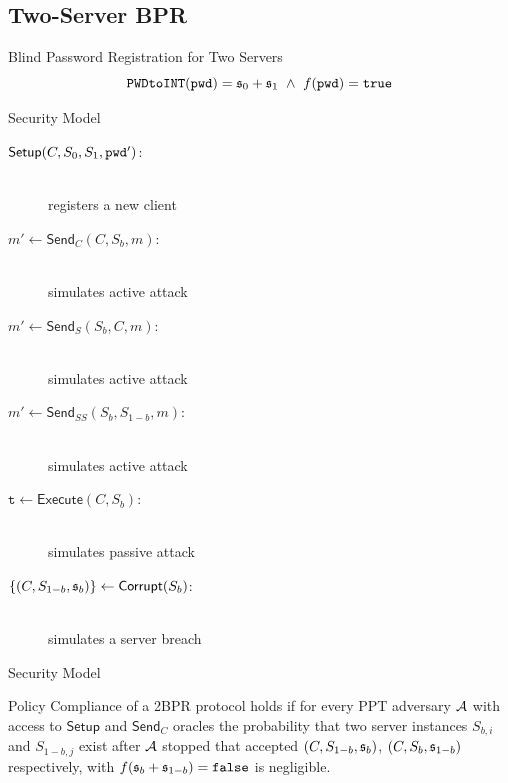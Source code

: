 \documentclass[notes,xcolor=dvipsnames]{beamer}
\begin{document}

\subsection{Two-Server BPR}

\begin{frame}{Blind Password Registration for Two Servers}
  \[
    \texttt{PWDtoINT}(\mathtt{pwd})=\mathfrak{s}_0 + \mathfrak{s}_1 ~ \wedge ~ f(\mathtt{pwd})=\mathtt{true}
  \]
\end{frame}

\begin{frame}{Security Model}
    \begin{description}
      \item[$\mathsf{Setup}(C,S_{0},S_1,\mathtt{pwd}')$:] \hfill \\ registers a new client
      \item[$m'\gets\mathsf{Send}_C(C,S_{b},m)$:] \hfill \\ simulates active attack
      \item[$m'\gets\mathsf{Send}_S(S_b,C,m)$:] \hfill \\ simulates active attack
      \item[$m'\gets\mathsf{Send}_{SS}(S_b,S_{1-b},m)$:] \hfill \\ simulates active attack
      \item[$\mathtt{t}\gets\mathsf{Execute}(C,S_b)$:] \hfill \\ simulates passive attack
      \item[$\{(C,S_{1-b},\mathfrak{s}_b)\}\gets\mathsf{Corrupt}(S_b)$:] \hfill \\ simulates a server breach
    \end{description}
\end{frame}

\begin{frame}{Security Model}
  \begin{definition}\label{def:pc}
  Policy Compliance of a 2BPR protocol holds if for every PPT adversary $\mathcal{A}$ with access to $\mathsf{Setup}$ and $\mathsf{Send}_C$ oracles the probability that two server instances $S_{b,i}$ and $S_{1-b,j}$ exist after $\mathcal{A}$ stopped that accepted $(C,S_{1-b},\mathfrak{s}_b)$, $(C,S_{b},\mathfrak{s}_{1-b})$ respectively, with $f(\mathfrak{s}_b+\mathfrak{s}_{1-b})=\mathtt{false}$ is negligible.
  \end{definition}
\end{frame}
\end{document}
